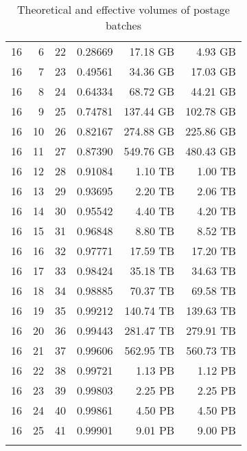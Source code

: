 \begin{longtable}{rrrrrr}
16 & 6 & 22 & 0.28669 & 17.18 GB & 4.93 GB \\
16 & 7 & 23 & 0.49561 & 34.36 GB & 17.03 GB \\
16 & 8 & 24 & 0.64334 & 68.72 GB & 44.21 GB \\
16 & 9 & 25 & 0.74781 & 137.44 GB & 102.78 GB \\
16 & 10 & 26 & 0.82167 & 274.88 GB & 225.86 GB \\
16 & 11 & 27 & 0.87390 & 549.76 GB & 480.43 GB \\
16 & 12 & 28 & 0.91084 & 1.10 TB & 1.00 TB \\
16 & 13 & 29 & 0.93695 & 2.20 TB & 2.06 TB \\
16 & 14 & 30 & 0.95542 & 4.40 TB & 4.20 TB \\
16 & 15 & 31 & 0.96848 & 8.80 TB & 8.52 TB \\
16 & 16 & 32 & 0.97771 & 17.59 TB & 17.20 TB \\
16 & 17 & 33 & 0.98424 & 35.18 TB & 34.63 TB \\
16 & 18 & 34 & 0.98885 & 70.37 TB & 69.58 TB \\
16 & 19 & 35 & 0.99212 & 140.74 TB & 139.63 TB \\
16 & 20 & 36 & 0.99443 & 281.47 TB & 279.91 TB \\
16 & 21 & 37 & 0.99606 & 562.95 TB & 560.73 TB \\
16 & 22 & 38 & 0.99721 & 1.13 PB & 1.12 PB \\
16 & 23 & 39 & 0.99803 & 2.25 PB & 2.25 PB \\
16 & 24 & 40 & 0.99861 & 4.50 PB & 4.50 PB \\
16 & 25 & 41 & 0.99901 & 9.01 PB & 9.00 PB \\
\bottomrule
\caption{Theoretical and effective volumes of postage batches}
\label{tab:batch-utilisation}
\end{longtable}
